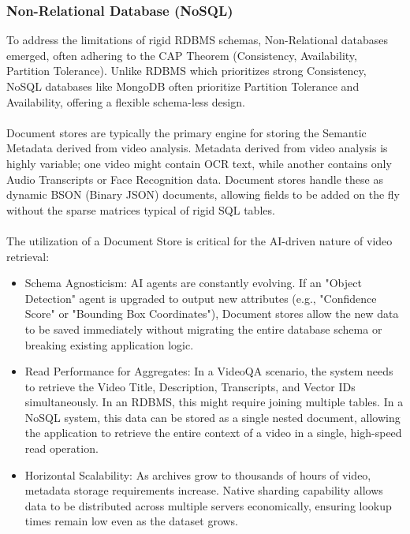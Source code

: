 \subsubsection*{Non-Relational Database (NoSQL)}
To address the limitations of rigid RDBMS schemas, Non-Relational databases emerged, often adhering to the CAP Theorem (Consistency, Availability, Partition Tolerance). Unlike RDBMS which prioritizes strong Consistency, NoSQL databases like MongoDB often prioritize Partition Tolerance and Availability, offering a flexible schema-less design.
\\\\Document stores are typically the primary engine for storing the Semantic Metadata derived from video analysis. Metadata derived from video analysis is highly variable; one video might contain OCR text, while another contains only Audio Transcripts or Face Recognition data. Document stores handle these as dynamic BSON (Binary JSON) documents, allowing fields to be added on the fly without the sparse matrices typical of rigid SQL tables.\\\\
The utilization of a Document Store is critical for the AI-driven nature of video retrieval:
\begin{itemize}
    \item Schema Agnosticism: AI agents are constantly evolving. If an "Object Detection" agent is upgraded to output new attributes (e.g., "Confidence Score" or "Bounding Box Coordinates"), Document stores allow the new data to be saved immediately without migrating the entire database schema or breaking existing application logic.
    \item Read Performance for Aggregates: In a VideoQA scenario, the system needs to retrieve the Video Title, Description, Transcripts, and Vector IDs simultaneously. In an RDBMS, this might require joining multiple tables. In a NoSQL system, this data can be stored as a single nested document, allowing the application to retrieve the entire context of a video in a single, high-speed read operation.
    \item Horizontal Scalability: As archives grow to thousands of hours of video, metadata storage requirements increase. Native sharding capability allows data to be distributed across multiple servers economically, ensuring lookup times remain low even as the dataset grows.
\end{itemize}

